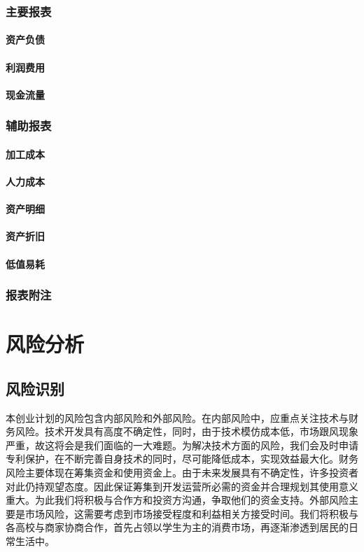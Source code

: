 \documentclass[violet]{main}
\begin{document}
			\subsection{主要报表}
				\subsubsection{资产负债}
				\subsubsection{利润费用}
				\subsubsection{现金流量}
			\subsection{辅助报表}
				\subsubsection{加工成本}
				\subsubsection{人力成本}
				\subsubsection{资产明细}
				\subsubsection{资产折旧}
				\subsubsection{低值易耗}
			\subsection{报表附注}
	\chapter{风险分析}
		\section{风险识别}
			本创业计划的风险包含内部风险和外部风险。在内部风险中，应重点关注技术与财务风险。技术开发具有高度不确定性，同时，由于技术模仿成本低，市场跟风现象严重，故这将会是我们面临的一大难题。为解决技术方面的风险，我们会及时申请专利保护，在不断完善自身技术的同时，尽可能降低成本，实现效益最大化。财务风险主要体现在筹集资金和使用资金上。由于未来发展具有不确定性，许多投资者对此仍持观望态度。因此保证筹集到开发运营所必需的资金并合理规划其使用意义重大。为此我们将积极与合作方和投资方沟通，争取他们的资金支持。外部风险主要是市场风险，这需要考虑到市场接受程度和利益相关方接受时间。我们将积极与各高校与商家协商合作，首先占领以学生为主的消费市场，再逐渐渗透到居民的日常生活中。
\end{document}
